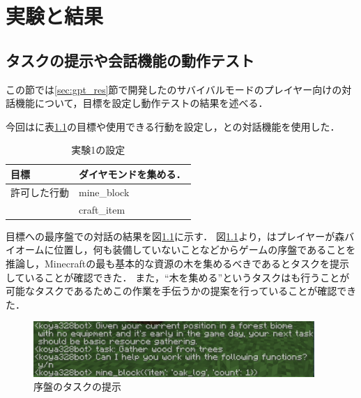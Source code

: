 \chapter{実験と結果}	
\thispagestyle{plain}   %

\section{タスクの提示や会話機能の動作テスト}\label{sec:gpt_res_test}
この節では\ref{sec:gpt_res}節で開発した{\mason}のサバイバルモードのプレイヤー向けの対話機能について，目標を設定し動作テストの結果を述べる．

今回は{\mason}に表\ref{tab:goal_and_action}の目標や使用できる行動を設定し，{\mason}との対話機能を使用した．

\begin{table}[H]
    \caption{実験1の設定}\label{tab:goal_and_action}
    \centering
    \begin{tabular}{ll}
        \hline \hline
        目標 & ダイヤモンドを集める． \\
        \hline
        許可した行動 & mine\_block \\
        　 & craft\_item \\
        \hline
    \end{tabular}
\end{table}

目標への最序盤での対話の結果を図\ref{fig:first_task}に示す．
図\ref{fig:first_task}より，{\mason}はプレイヤーが森バイオームに位置し，何も装備していないことなどからゲームの序盤であることを推論し，Minecraftの最も基本的な資源の木を集めるべきであるとタスクを提示していることが確認できた．
また，``木を集める''というタスクは{\mason}も行うことが可能なタスクであるためこの作業を手伝うかの提案を行っていることが確認できた．

\begin{figure}[H]
    \centering
    \includegraphics[width=0.95\textwidth]{fig/first_task.PNG}
    \caption{序盤のタスクの提示}
    \label{fig:first_task}
\end{figure}

